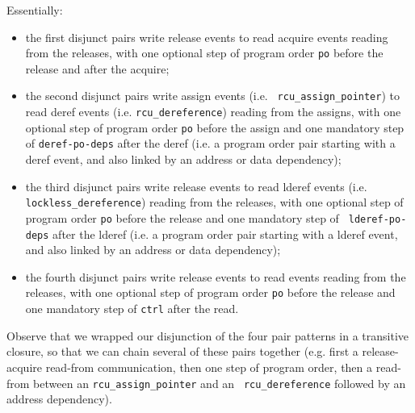 \documentclass[a4paper]{article}
\begin{document}
\pagebreak

Essentially:
\begin{itemize}
\item the first disjunct pairs write release events to read acquire events
reading from the releases, with one optional step of program order {\tt po}
before the release and after the acquire;
\item the second disjunct pairs write assign events (i.e. {\tt
rcu\_assign\_pointer}) to read deref events (i.e. {\tt rcu\_dereference})
reading from the assigns, with one optional step of program order {\tt po}
before the assign and one mandatory step of {\tt deref-po-deps} after the deref
(i.e. a program order pair starting with a deref event, and also linked by an
address or data dependency);
\item the third disjunct pairs write release events to read lderef events (i.e.
{\tt lockless\_dereference}) reading from the releases, with one optional step
of program order {\tt po} before the release and one mandatory step of {\tt
lderef-po-deps} after the lderef (i.e. a program order pair starting with a
lderef event, and also linked by an address or data dependency);
\item the fourth disjunct pairs write release events to read events reading
from the releases, with one optional step of program order {\tt po} before the
release and one mandatory step of {\tt ctrl} after the read. 
\end{itemize}

Observe that we wrapped our disjunction of the four pair patterns in a
transitive closure, so that we can chain several of these pairs together (e.g.
first a release-acquire read-from communication, then one step of program
order, then a read-from between an {\tt rcu\_assign\_pointer} and an {\tt
rcu\_dereference} followed by an address dependency).
\end{document}
